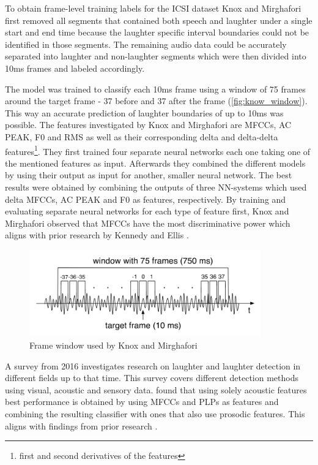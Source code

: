 \documentclass[bsc,frontabs,parskip,deptreport]{infthesis}
\begin{document}
To obtain frame-level training labels for the ICSI dataset Knox and Mirghafori first removed all segments that contained both speech and laughter under a single start and end time because the laughter specific interval boundaries could not be identified in those segments. 
The remaining audio data could be accurately separated into laughter and non-laughter segments which were then divided into 10ms frames and labeled accordingly.

The model was trained to classify each 10ms frame using a window of 75 frames around the target frame - 37 before and 37 after the frame (\autoref{fig:know_window}).
This way an accurate prediction of laughter boundaries of up to 10ms was possible. 
The features investigated by Knox and Mirghafori are MFCCs, AC PEAK, F0 and RMS as well as their corresponding delta and delta-delta features\footnote{first and second derivatives of the features}.
They first trained four separate neural networks each one taking one of the mentioned features as input.
Afterwards they combined the different models by using their output as input for another, smaller neural network.
The best results were obtained by combining the outputs of three NN-systems which used delta MFCCs, AC PEAK and F0 as features, respectively.
By training and evaluating separate neural networks for each type of feature first, Knox and Mirghafori observed that MFCCs have the most discriminative power which aligns with prior research by Kennedy and Ellis \citep{kennedy2004laughter}.

\begin{figure}[htp]
    \centering
    \includegraphics[width=10cm]{imgs/Knox_window.png}
    \caption{Frame window used by Knox and Mirghafori}
    \label{fig:know_window}
\end{figure}

A survey from 2016 \citep{cosentino2016quantitative} investigates research on laughter and laughter detection in different fields up to that time.
This survey covers different detection methods using visual, acoustic and sensory data.
\citeauthor{cosentino2016quantitative} found that using solely acoustic features best performance is obtained by using MFCCs and PLPs as features and combining the resulting classifier with ones that also use prosodic features.
This aligns with findings from prior research \citep{truong2007automatic, knox2006automatic}.
\end{document}
